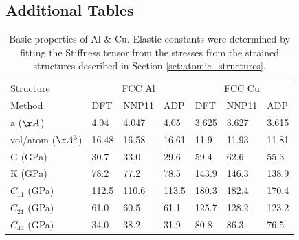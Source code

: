 \documentclass{article}
\begin{document}
\subsection{Additional Tables}


\begin{table}[H]
\begin{tabular}{l|lll|lll}%
\hline%
Structure&\multicolumn{3}{c}{FCC Al}&\multicolumn{3}{c}{FCC Cu}\\%
Method&DFT&NNP11&ADP&DFT&NNP11&ADP\\%
\hline%
a ($\AA$)&4.04&4.047&4.05&3.625&3.627&3.615\\%
vol/atom ($\AA^3$)&16.48&16.58&16.61&11.9&11.93&11.81\\%
G (GPa)&30.7&33.0&29.6&59.4&62.6&55.3\\%
K (GPa)&78.2&77.2&78.5&143.9&146.3&138.9\\%
$C_{11}$ (GPa)&112.5&110.6&113.5&180.3&182.4&170.4\\%
$C_{21}$ (GPa)&61.0&60.5&61.1&125.7&128.2&123.2\\%
$C_{44}$ (GPa)&34.0&38.2&31.9&80.8&86.3&76.5\\%
\hline%
\end{tabular}%
\caption{Basic properties of Al \& Cu. Elastic constants were determined by fitting the Stiffness tensor from the stresses from the strained structures described in Section \ref{sct:atomic_structures}.}  
\end{table}
\end{document}
